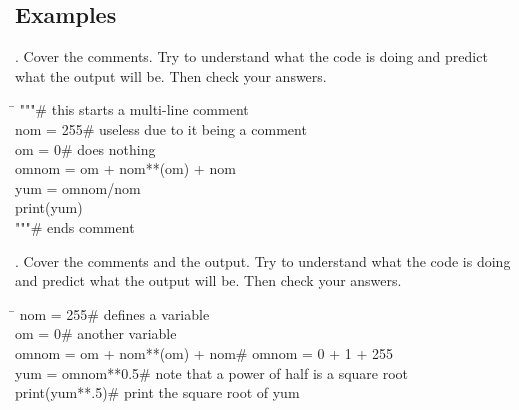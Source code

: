 \documentclass{article}
\begin{document}
\subsection{Examples}
. Cover the comments. Try to understand what the code is doing and predict what the output will be. Then check your answers.
\vspace{1 mm}
\begin{tcolorbox}
	\ttfamily
	\begin{tabbing}
		\hspace{3.25 in}\=\hspace{3.25 in} \kill
		"""\>\# this starts a multi-line comment\\
		nom = 255\>\# useless due to it being a comment\\
		om = 0\>\# does nothing\\
		omnom = om + nom**(om) + nom\>\\
		yum = omnom/nom\>\\
		print(yum)\>\\
		"""\>\# ends comment
	\end{tabbing}
\end{tcolorbox}
\begin{tcolorbox}[colback=output]
	\ttfamily
\end{tcolorbox}
\vspace{.25 cm}
. Cover the comments and the output. Try to understand what the code is doing and predict what the output will be. Then check your answers.
\vspace{1 mm}
\begin{tcolorbox}
	\ttfamily
	\begin{tabbing}
		\hspace{3.25 in}\=\hspace{3.25 in} \kill
		nom = 255\>\# defines a variable\\
		om = 0\>\# another variable\\
		omnom = om + nom**(om) + nom\>\# omnom = 0 + 1 + 255\\
		yum = omnom**0.5\>\# note that a power of half is a square root\\
		print(yum**.5)\>\# print the square root of yum
	\end{tabbing}
\end{tcolorbox}
\begin{tcolorbox}[colback=output]
	\ttfamily
	4
\end{tcolorbox}
\end{document}
